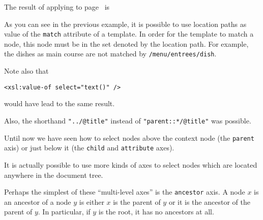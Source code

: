 %
\begin{slide}

\raggedslides[0pt]

The result of applying 
to 
page~\hyperlink{hyper:menu}{\pageref{menu}} is
{\small}

\end{slide}


%
\begin{slide}

\raggedslides[0pt]

As you can see in the previous example, it is possible to use location
paths as value of the \texttt{match} attribute of a template. In order
for the template to match a node, this node must be in the set denoted
by the location path. For example, the dishes as main course are not
matched by \verb|/menu/entrees/dish|.

Note also that 
\begin{verbatim}
<xsl:value-of select="text()" />
\end{verbatim}
would have lead to the same result.

Also, the shorthand \verb|"../@title"| instead of
\verb|"parent::*/@title"| was possible.

\end{slide}

%
\begin{slide}

\raggedslides[0pt]

Until now we have seen how to select nodes above the context node (the
\texttt{parent} axis) or just below it (the \texttt{child} and
\texttt{attribute} axes).

It is actually possible to use more kinds of axes to select nodes
which are located anywhere in the document tree.

Perhaps the simplest of these ``multi-level axes'' is the
\texttt{ancestor} axis. A node \(x\) is an ancestor of a node \(y\) is
either \(x\) is the parent of \(y\) or it is the ancestor of the
parent of \(y\). In particular, if \(y\) is the root, it has no
ancestors at all.

\end{slide}


